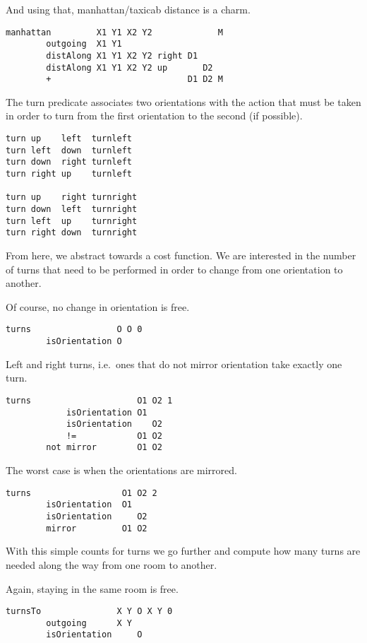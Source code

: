 And using that, manhattan/taxicab distance is a charm.

\begin{verbatim}
manhattan         X1 Y1 X2 Y2             M
        outgoing  X1 Y1
        distAlong X1 Y1 X2 Y2 right D1
        distAlong X1 Y1 X2 Y2 up       D2
        +                           D1 D2 M
\end{verbatim}

The turn predicate associates two orientations with the action that must
be taken in order to turn from the first orientation to the second (if
possible).

\begin{verbatim}
turn up    left  turnleft
turn left  down  turnleft
turn down  right turnleft
turn right up    turnleft

turn up    right turnright
turn down  left  turnright
turn left  up    turnright
turn right down  turnright
\end{verbatim}

From here, we abstract towards a cost function. We are interested in the
number of turns that need to be performed in order to change from one
orientation to another.

Of course, no change in orientation is free.

\begin{verbatim}
turns                 O O 0
        isOrientation O
\end{verbatim}

Left and right turns, i.e.~ones that do not mirror orientation take
exactly one turn.

\begin{verbatim}
turns                     O1 O2 1
            isOrientation O1
            isOrientation    O2
            !=            O1 O2
        not mirror        O1 O2
\end{verbatim}

The worst case is when the orientations are mirrored.

\begin{verbatim}
turns                  O1 O2 2
        isOrientation  O1
        isOrientation     O2
        mirror         O1 O2
\end{verbatim}

With this simple counts for turns we go further and compute how many
turns are needed along the way from one room to another.

Again, staying in the same room is free.

\begin{verbatim}
turnsTo               X Y O X Y 0
        outgoing      X Y
        isOrientation     O
\end{verbatim}

